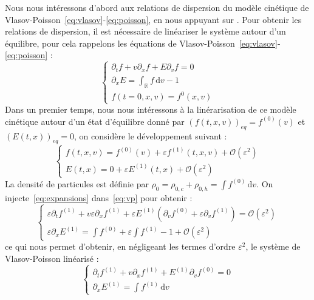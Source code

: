 Nous nous intéressons d'abord aux relations de dispersion du modèle cinétique de Vlasov-Poisson~\eqref{eq:vlasov}-\eqref{eq:poisson}, en nous appuyant sur \cite{Sonnendrucker:2015}. Pour obtenir les relations de dispersion, il est nécessaire de linéariser le système autour d'un équilibre, pour cela rappelons les équations de Vlasov-Poisson~\eqref{eq:vlasov}-\eqref{eq:poisson} :
\begin{equation}
  \begin{cases}
    \partial_t f + v\partial_xf + E\partial_vf = 0 \\
    \partial_x E = \int_\mathbb{R} f\,\mathrm{d}v - 1 \\
    f(t=0, x, v)=f^0(x,v)
  \end{cases}
  \label{eq:vp}
\end{equation}
Dans un premier temps, nous nous intéressons à la linérarisation de ce modèle cinétique autour d'un état d'équilibre donné par $\left(f(t,x,v)\right)_{eq} = f^{(0)}(v)$ et $\left(E(t,x)\right)_{eq} = 0$, on considère le développement suivant :
\begin{equation}
  \begin{cases}
    f(t,x,v) = f^{(0)}(v) + \varepsilon f^{(1)}(t,x,v) + \mathcal{O}(\varepsilon^2) \\
    E(t,x) = 0 + \varepsilon E^{(1)}(t,x) + \mathcal{O}(\varepsilon^2)
  \end{cases}
  \label{eq:expansions}
\end{equation}
La densité de particules est définie par $\rho_0 = \rho_{0,c}+\rho_{0,h} = \int f^{(0)}\,\mathrm{d}v$. On injecte~\eqref{eq:expansions} dans~\eqref{eq:vp} pour obtenir :
$$
  \begin{cases}
    \varepsilon\partial_t f^{(1)} + v\varepsilon\partial_x f^{(1)} + \varepsilon E^{(1)}\left(\partial_v f^{(0)}+\varepsilon\partial_v f^{(1)}\right)=\mathcal{O}(\varepsilon^2) \\
    \varepsilon\partial_x E^{(1)} = \int f^{(0)} + \varepsilon\int f^{(1)} - 1 + \mathcal{O}(\varepsilon^2)
  \end{cases}
$$
ce qui nous permet d'obtenir, en négligeant les termes d'ordre $\varepsilon^2$, le système de Vlasov-Poisson linéarisé :
\begin{equation}
  \begin{cases}
    \partial_t f^{(1)} + v\partial_x f^{(1)} + E^{(1)}\partial_v f^{(0)} = 0 \\
    \partial_x E^{(1)} = \int f^{(1)}\,\mathrm{d}v
  \end{cases}
  \label{eq:systVPlin}
\end{equation}


